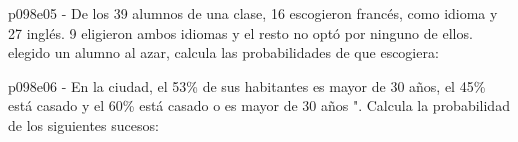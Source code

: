 \documentclass[spanish, 11pt]{exam}
\begin{document}
        \begin{questions}
        \question p098e05 - De los 39 alumnos de una clase, 16 escogieron francés, como idioma y 27 inglés. 9 eligieron ambos idiomas y
el resto no optó por ninguno de ellos. elegido un alumno al azar, calcula las probabilidades de que escogiera:

        \begin{multicols}{2} 
        \end{multicols}
        \question p098e06 - En la ciudad, el 53\% de sus habitantes es mayor de 30 años, el 45\% está
casado y el 60\% está casado o es mayor de 30 años ". 
Calcula la probabilidad de los siguientes sucesos:
        \begin{multicols}{2} 
        \end{multicols}
        
    \end{questions}
    
\end{document}
